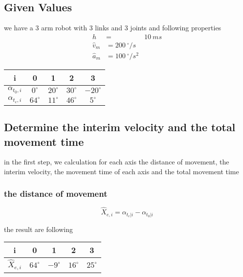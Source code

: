 \documentclass[%
  professionalfonts,%
  xcolor={%
    usenames,%
    dvipsnames,%
    svgnames,%
    table,%
    hyperref%
  }%
]{beamer}
\begin{document}
\subsection{Given Values }
\begin{frame}
we have a 3 arm robot with 3 links and 3 joints and following properties\\

\begin{align*}
h & = & 10 ~ms \\
\hat{v}_{m} & = 200 ~^\circ/s \\
\hat{a}_{m} & = 100 ~^\circ/s^2
\end{align*}

\begin{center}
\begin{tabular}{ccccc}
\toprule
i & 0 & 1 & 2 & 3 \\
\midrule
$\alpha_{t_{0},i}$ & $  0^\circ$ & $20^\circ$ & $30^\circ$ & $-20^\circ$ \\ 
$\alpha_{t_{e},i}$ & $ 64^\circ$ & $11^\circ$ & $46^\circ$ & $  5^\circ$ \\
\bottomrule
\end{tabular}
\end{center}
\end{frame}

\subsection{Determine the interim velocity and the total movement time}
\begin{frame}
in the first step, we calculation for each axis the distance of movement, the interim velocity, the movement time of each axis and the total movement time

\subsubsection*{the distance of movement }
\begin{equation*}
\hat{X}_{e,i} = {\alpha_{t_{e}|i} - \alpha_{t_{0}|i}}
\end{equation*}

the result are following    
\begin{center}
\begin{tabular}{ccccc}
\toprule
i & 0 & 1 & 2 & 3 \\
\midrule
$\hat{X}_{e,i}$ & $ 64^\circ$ & $ -9^\circ$ & $16^\circ$ & $25^\circ$ \\
\bottomrule 
\end{tabular}
\end{center}
\end{frame}
\end{document}
